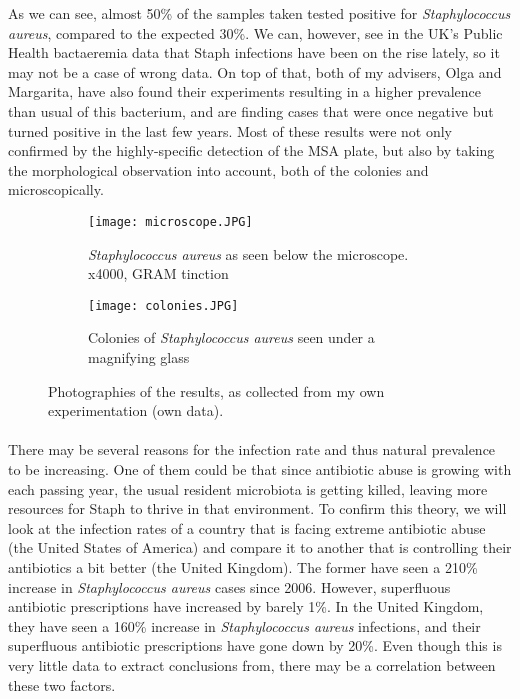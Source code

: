 As we can see, almost 50\% of the samples taken tested positive for \emph{Staphylococcus aureus}, compared to the expected 30\%\cite{StaphylococcusAureusHealthcare2020}. We can, however, see in the UK's Public Health bactaeremia data that Staph infections have been on the rise lately, so it may not be a case of wrong data\cite{englandMSSABacteraemiaAnnual2021}. On top of that, both of my advisers, Olga and Margarita, have also found their experiments resulting in a higher prevalence than usual of this bacterium, and are finding cases that were once negative but turned positive in the last few years. Most of these results were not only confirmed by the highly-specific detection of the MSA plate, but also by taking the morphological observation into account, both of the colonies and microscopically.\begin{figure}[H]\centering\begin{subfigure}[b]{0.4\linewidth}\texttt{[image: microscope.JPG]}\caption{\emph{Staphylococcus aureus} as seen below the microscope. x4000, GRAM tinction}\end{subfigure}\begin{subfigure}[b]{0.4\linewidth}\texttt{[image: colonies.JPG]}\caption{Colonies of \emph{Staphylococcus aureus} seen under a magnifying glass}\end{subfigure}\caption{Photographies of the results, as collected from my own experimentation (own data).}\end{figure}\paragraph{}There may be several reasons for the infection rate and thus natural prevalence to be increasing. One of them could be that since antibiotic abuse is growing with each passing year, the usual resident microbiota is getting killed, leaving more resources for Staph to thrive in that environment. To confirm this theory, we will look at the infection rates of a country that is facing extreme antibiotic abuse (the United States of America) and compare it to another that is controlling their antibiotics a bit better (the United Kingdom). The former have seen a 210\% increase in \emph{Staphylococcus aureus} cases since 2006. However, superfluous antibiotic prescriptions have increased by barely 1\%\cite{baggsEstimatingNationalTrends2016}. In the United Kingdom, they have seen a 160\% increase in \emph{Staphylococcus aureus} infections\cite{englandMSSABacteraemiaAnnual2021}, and their superfluous antibiotic prescriptions have gone down by 20\%. Even though this is very little data to extract conclusions from, there may be a correlation between these two factors.
